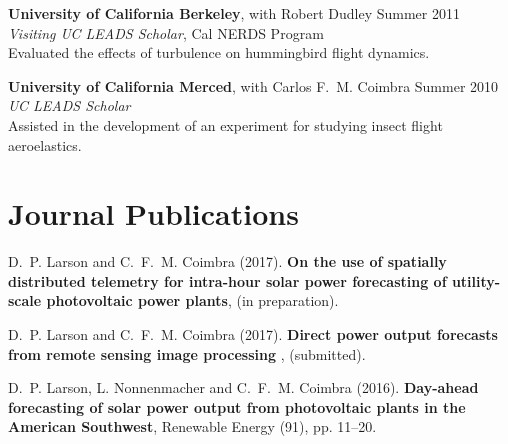 \documentclass[]{res}
\begin{document}
\begin{resume}
\textbf{University of California Berkeley}, with Robert Dudley \hfill Summer 2011 \\
\textit{Visiting UC LEADS Scholar}, Cal NERDS Program \\
Evaluated the effects of turbulence on hummingbird flight dynamics.

\textbf{University of California Merced}, with Carlos F.~M. Coimbra \hfill Summer 2010 \\
\textit{UC LEADS Scholar} \\
Assisted in the development of an experiment for studying insect flight aeroelastics.


%


\section{Journal Publications}
\vspace{0.1in}

D.~P. Larson and C.~F.~M. Coimbra (2017). \textbf{On the use of spatially distributed telemetry for intra-hour solar power forecasting of utility-scale photovoltaic power plants}, (in preparation).

D.~P. Larson and C.~F.~M. Coimbra (2017). \textbf{Direct power output forecasts from remote sensing image processing }, (submitted).

D.~P. Larson, L. Nonnenmacher and C.~F.~M. Coimbra (2016). \textbf{Day-ahead forecasting of solar power output from photovoltaic plants in the American Southwest}, Renewable Energy (91), pp. 11--20.



\end{resume}
\end{document}
